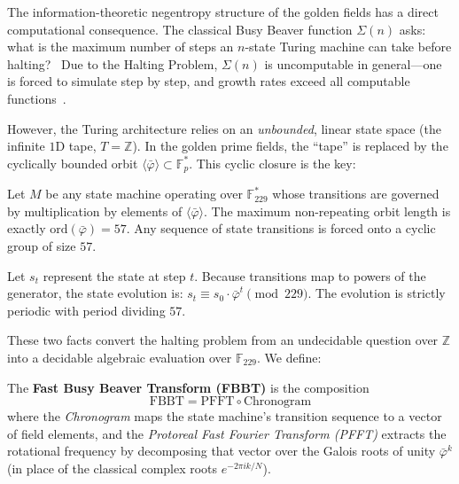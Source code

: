 The information-theoretic negentropy structure of the golden fields has a direct
computational consequence. The classical Busy Beaver function
$\Sigma(n)$ asks: what is the maximum number of steps an $n$-state
Turing machine can take before halting?~\cite{rado1962} Due to the
Halting Problem, $\Sigma(n)$ is uncomputable in general---one is
forced to simulate step by step, and growth rates exceed all
computable functions~\cite{aaronson2020}.

However, the Turing architecture relies on an \emph{unbounded},
linear state space (the infinite $1$D tape, $T = \mathbb{Z}$).
In the golden prime fields, the ``tape'' is replaced by the
cyclically bounded orbit $\langle\bar\varphi\rangle \subset
\mathbb{F}_p^*$. This cyclic closure is the key:

\begin{result}
\label{res:closure}
Let $M$ be any state machine operating over
$\mathbb{F}_{229}^*$ whose transitions are governed by
multiplication by elements of $\langle\bar\varphi\rangle$.
The maximum non-repeating orbit length is exactly
$\mathrm{ord}(\bar\varphi) = 57$. Any sequence of state
transitions is forced onto a cyclic group of size $57$.
\end{result}

\begin{result}
\label{res:phase}
Let $s_t$ represent the state at step $t$. Because transitions
map to powers of the generator, the state evolution is:
$s_t \equiv s_0 \cdot \bar\varphi^t \pmod{229}$.
The evolution is strictly periodic with period dividing $57$.
\end{result}

These two facts convert the halting problem from an undecidable
question over $\mathbb{Z}$ into a decidable algebraic evaluation
over $\mathbb{F}_{229}$. We define:

\begin{definition}
\label{def:fbbt}
The \textbf{Fast Busy Beaver Transform (FBBT)} is the composition
\[
\mathrm{FBBT} = \mathrm{PFFT} \circ \mathrm{Chronogram}
\]
where the \emph{Chronogram} maps the state machine's transition
sequence to a vector of field elements, and the \emph{Protoreal
Fast Fourier Transform (PFFT)} extracts the rotational frequency
by decomposing that vector over the Galois roots of unity
$\bar\varphi^{k}$ (in place of the classical complex roots
$e^{-2\pi i k/N}$).
\end{definition}

